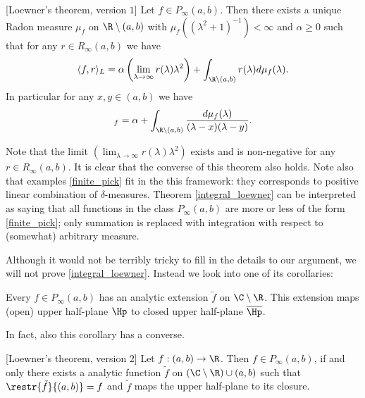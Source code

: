 \begin{lause}\label{integral_loewner}[Loewner's theorem, version $1$]
	Let $f \in P_{\infty}(a, b)$. Then there exists a unique Radon measure $\mu_{f}$ on $\R \setminus (a, b)$ with $\mu_{f}((\lambda^2 + 1)^{-1}) < \infty$ and $\alpha \geq 0$ such that for any $r \in R_{\infty}(a, b)$ we have
	\begin{align*}
		\langle f, r \rangle_{L} = \alpha \left(\lim_{\lambda \to \infty} r(\lambda) \lambda^2 \right) + \int_{\R \setminus (a, b)} r(\lambda) d \mu_{f}(\lambda).
	\end{align*}
	In particular for any $x,y \in (a, b)$ we have
	\begin{align*}
		[x, y]_{f} = \alpha + \int_{\R \setminus (a, b)} \frac{d \mu_{f}(\lambda)}{(\lambda - x) (\lambda - y)}.
	\end{align*}
\end{lause}

Note that the limit $\left(\lim_{\lambda \to \infty} r(\lambda) \lambda^2 \right)$ exists and is non-negative for any $r \in R_{\infty}(a, b)$. It is clear that the converse of this theorem also holds. Note also that examples \ref{finite_pick} fit in the this framework: they corresponds to positive linear combination of $\delta$-measures. Theorem \ref{integral_loewner} can be interpreted as saying that all functions in the class $P_{\infty}(a, b)$ are more or less of the form \ref{finite_pick}; only summation is replaced with integration with respect to (somewhat) arbitrary measure.

Although it would not be terribly tricky to fill in the details to our argument, we will not prove \ref{integral_loewner}. Instead we look into one of its corollaries:

\begin{kor}
	Every $f \in P_{\infty}(a, b)$ has an analytic extension $\tilde{f}$ on $\C \setminus \R$. This extension maps (open) upper half-plane $\Hp$ to closed upper half-plane $\overline{\Hp}$.
\end{kor}

In fact, also this corollary has a converse.

\begin{lause}\label{weak_loewner}[Loewner's theorem, version $2$]
	Let $f : (a, b) \to \R$. Then $f \in P_{\infty}(a, b)$, if and only there exists a analytic function $\tilde{f}$ on $(\C \setminus \R) \cup (a, b)$ such that $\restr{\tilde{f}}{(a, b)} = f$ and $\tilde{f}$ maps the upper half-plane to its closure.
\end{lause}

